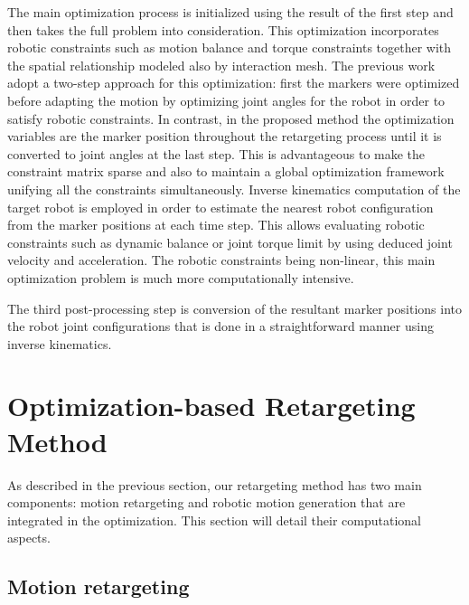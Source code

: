 \documentclass[letterpaper, 10 pt, conference]{ieeeconf}  %
\begin{document}
The main optimization process is initialized using the result of the 
first step and then takes the full problem into consideration. 
This optimization incorporates robotic constraints such as
motion balance and torque constraints together with the spatial
relationship modeled also by interaction mesh.
The previous work \cite{Nakaoka12Humanoids} adopt a two-step approach
for this optimization:
first the markers were optimized before adapting the motion by
optimizing joint angles for the robot in order to satisfy robotic
constraints.  
In contrast, in the proposed method the
optimization variables are the marker position throughout the
retargeting process until it is converted to joint angles at the last
step.
This is advantageous to make the constraint matrix sparse \cite{Komura10}
and also to maintain a global optimization framework
unifying all the constraints simultaneously. 
Inverse  kinematics computation of the target robot is employed in
order to estimate the nearest robot configuration from the marker positions
at each time step. 
This allows evaluating robotic constraints such as dynamic balance or
joint torque limit by using deduced joint velocity and acceleration.
The robotic constraints being non-linear, this main
optimization problem is much more computationally intensive.

The third post-processing step is conversion of the resultant marker
positions into the robot joint configurations that is done in a
straightforward manner using inverse kinematics.  


\section{Optimization-based Retargeting Method}
\label{sec:retargeting}

As described in the previous section, our retargeting method has two
main components: motion retargeting and robotic motion generation that
are integrated in the optimization. This section will detail
their computational aspects.

\subsection{Motion retargeting}
\end{document}
